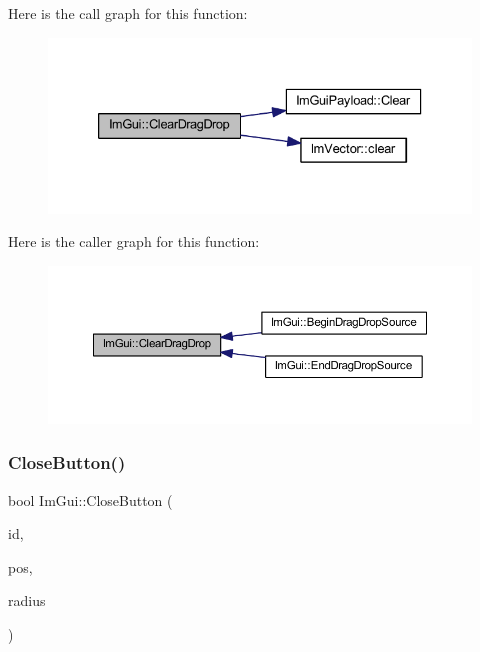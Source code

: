 Here is the call graph for this function\+:
\nopagebreak
\begin{figure}[H]
\begin{center}
\leavevmode
\includegraphics[width=333pt]{namespace_im_gui_adae8f94649956a2a717c00dbf81a5df9_cgraph}
\end{center}
\end{figure}
Here is the caller graph for this function\+:
\nopagebreak
\begin{figure}[H]
\begin{center}
\leavevmode
\includegraphics[width=350pt]{namespace_im_gui_adae8f94649956a2a717c00dbf81a5df9_icgraph}
\end{center}
\end{figure}
\mbox{\label{namespace_im_gui_a5e8e4df6418dcda3c4c5d15ecdf7d968}} 
\subsubsection{\texorpdfstring{Close\+Button()}{CloseButton()}}
{\footnotesize\ttfamily bool Im\+Gui\+::\+Close\+Button (\begin{DoxyParamCaption}\item[{\mbox{\hyperlink{imgui_8h_a1785c9b6f4e16406764a85f32582236f}{Im\+Gui\+ID}}}]{id,  }\item[{const \mbox{\hyperlink{struct_im_vec2}{Im\+Vec2}} \&}]{pos,  }\item[{float}]{radius }\end{DoxyParamCaption})}

